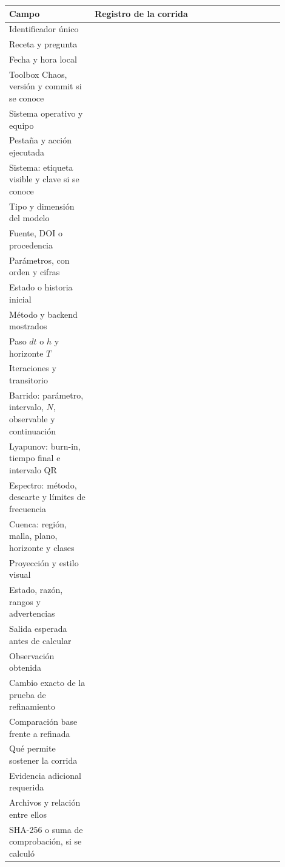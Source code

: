 \begin{longtable}{@{}>{\raggedright\arraybackslash}p{0.28\linewidth}>{\raggedright\arraybackslash}p{0.62\linewidth}@{}}
\toprule
Campo & Registro de la corrida \\
\midrule
\endhead
Identificador único & \rule{0pt}{2.8ex} \\
Receta y pregunta & \rule{0pt}{3.5ex} \\
Fecha y hora local & \rule{0pt}{2.8ex} \\
Toolbox Chaos, versión y commit si se conoce & \rule{0pt}{3.5ex} \\
Sistema operativo y equipo & \rule{0pt}{3.5ex} \\
Pestaña y acción ejecutada & \rule{0pt}{3.5ex} \\
Sistema: etiqueta visible y clave si se conoce & \rule{0pt}{3.5ex} \\
Tipo y dimensión del modelo & \rule{0pt}{2.8ex} \\
Fuente, DOI o procedencia & \rule{0pt}{3.5ex} \\
Parámetros, con orden y cifras & \rule{0pt}{4.5ex} \\
Estado o historia inicial & \rule{0pt}{4.5ex} \\
Método y backend mostrados & \rule{0pt}{3.5ex} \\
Paso \(dt\) o \(h\) y horizonte \(T\) & \rule{0pt}{3.5ex} \\
Iteraciones y transitorio & \rule{0pt}{3.5ex} \\
Barrido: parámetro, intervalo, \(N\), observable y continuación & \rule{0pt}{5.0ex} \\
Lyapunov: burn-in, tiempo final e intervalo QR & \rule{0pt}{4.5ex} \\
Espectro: método, descarte y límites de frecuencia & \rule{0pt}{4.5ex} \\
Cuenca: región, malla, plano, horizonte y clases & \rule{0pt}{5.0ex} \\
Proyección y estilo visual & \rule{0pt}{4.5ex} \\
Estado, razón, rangos y advertencias & \rule{0pt}{5.0ex} \\
Salida esperada antes de calcular & \rule{0pt}{4.5ex} \\
Observación obtenida & \rule{0pt}{6.0ex} \\
Cambio exacto de la prueba de refinamiento & \rule{0pt}{5.0ex} \\
Comparación base frente a refinada & \rule{0pt}{6.0ex} \\
Qué permite sostener la corrida & \rule{0pt}{5.0ex} \\
Evidencia adicional requerida & \rule{0pt}{5.0ex} \\
Archivos y relación entre ellos & \rule{0pt}{5.0ex} \\
SHA-256 o suma de comprobación, si se calculó & \rule{0pt}{3.5ex} \\
\bottomrule
\end{longtable}


